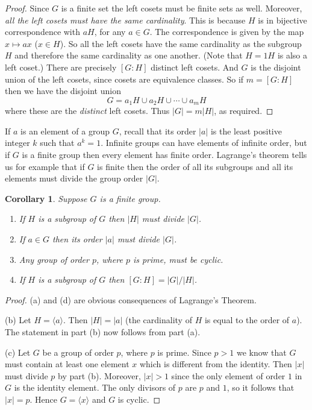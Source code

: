 \documentclass[11pt,oneside]{article}
\newtheorem{cor}[thm]{Corollary}
\theoremstyle{definition}
\newcommand{\gen}[1]{\langle #1 \rangle}
\begin{document}
\begin{proof}
Since $G$ is a finite set the left cosets must be finite sets as
well. Moreover, {\em all the left cosets must have the same
  cardinality}. This is because $H$ is in bijective correspondence
with $aH$, for any $a \in G$. The correspondence is given by the map
$x \mapsto ax$ ($x\in H$). So all the left cosets have the same
cardinality as the subgroup $H$ and therefore the same cardinality as
one another. (Note that $H = 1H$ is also a left coset.)  There are
precisely $[G:H]$ distinct left cosets. And $G$ is the disjoint union
of the left cosets, since cosets are equivalence classes. So if $m =
[G:H]$ then we have the disjoint union
\[
  G = a_1H \cup a_2H \cup \cdots \cup a_mH 
\]
where these are the {\em distinct} left cosets. Thus $|G| = m
|H|$, as required.
\end{proof}

If $a$ is an element of a group $G$, recall that its order $|a|$ is
the least positive integer $k$ such that $a^k = 1$. Infinite groups
can have elements of infinite order, but if $G$ is a finite group then
every element has finite order. Lagrange's theorem tells us for
example that if $G$ is finite then the order of all its subgroups and
all its elements must divide the group order $|G|$.

\begin{cor}
Suppose $G$ is a finite group. 
\begin{enumerate}
\item[(a)] If $H$ is a subgroup of $G$ then $|H|$ must divide $|G|$.
\item[(b)] If $a\in G$ then its order $|a|$ must divide $|G|$.
\item[(c)] Any group of order $p$, where $p$ is prime, must be cyclic.
\item[(d)] If $H$ is a subgroup of $G$ then $[G:H]=|G|/|H|$. 
\end{enumerate}
\end{cor}

\begin{proof} (a) and (d) are obvious consequences of Lagrange's Theorem. 

(b) Let $H = \gen{a}$. Then $|H|=|a|$ (the cardinality of $H$ is equal
  to the order of $a$).  The statement in part (b) now follows from
  part (a).

(c) Let $G$ be a group of order $p$, where $p$ is prime. Since $p>1$
we know that $G$ must contain at least one element $x$ which is
different from the identity. Then $|x|$ must divide $p$ by part (b).
Moreover, $|x|>1$ since the only element of order $1$ in $G$ is the
identity element. The only divisors of $p$ are $p$ and $1$, so it
follows that $|x| = p$. Hence $G = \gen{x}$ and $G$ is cyclic.
\end{proof}
\end{document}
